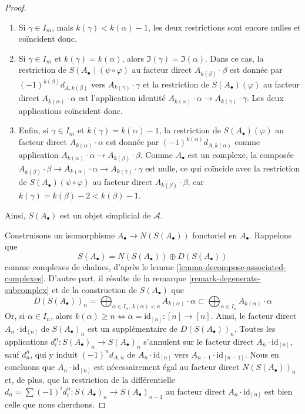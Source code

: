 \begin{proof}
\begin{enumerate}
\begin{enumerate}
$S(A_\bullet)(\psi \circ \varphi)$ au facteur direct $A_{k(\beta)} \cdot \beta$
et celle de $S(A_\bullet)(\varphi)$ au facteur direct
$A_{k(\alpha)} \cdot \alpha$ sont toutes deux nulles ; elles coïncident donc.
\item Si $\gamma \in I_m$, mais $k(\gamma) < k(\alpha) - 1$,
les deux restrictions sont encore nulles et coïncident donc.
\item Si $\gamma \in I_m$ et $k(\gamma) = k(\alpha)$, alors
$\Im(\gamma) = \Im(\alpha)$. Dans ce cas, la restriction de
$S(A_\bullet)(\psi \circ \varphi)$
au facteur direct $A_{k(\beta)} \cdot \beta$ est donnée par
$(-1)^{k(\beta)}d_{A, k(\beta)}$ vers $A_{k(\gamma)} \cdot \gamma$
et la restriction de $S(A_\bullet)(\varphi)$ au facteur direct
$A_{k(\alpha)} \cdot \alpha$ est l'application identité
$A_{k(\alpha)} \cdot \alpha \to A_{k(\gamma)} \cdot \gamma$.
Les deux applications coïncident donc.
\item Enfin, si $\gamma \in I_m$ et $k(\gamma) = k(\alpha) - 1$, la restriction de
$S(A_\bullet)(\varphi)$ au facteur direct
$A_{k(\alpha)} \cdot \alpha$ est donnée par $(-1)^{k(\alpha)} d_{A, k(\alpha)}$
comme application
$A_{k(\alpha)} \cdot \alpha \to A_{k(\beta)} \cdot \beta$.
Comme $A_\bullet$ est un complexe, la composée
$A_{k(\beta)} \cdot \beta \to
A_{k(\alpha)} \cdot \alpha \to A_{k(\gamma)} \cdot \gamma$
est nulle, ce qui coïncide avec la restriction de
$S(A_\bullet)(\psi \circ \varphi)$
au facteur direct $A_{k(\beta)} \cdot \beta$,
car $k(\gamma) = k(\beta) - 2 < k(\beta) - 1$.
\end{enumerate}
\end{enumerate}
Ainsi, $S(A_\bullet)$ est un objet simplicial de $\mathcal{A}$.

\medskip\noindent
Construisons un isomorphisme $A_\bullet \to N(S(A_\bullet))$
fonctoriel en $A_\bullet$. Rappelons que
$$
S(A_\bullet) =  N(S(A_\bullet)) \oplus D(S(A_\bullet))
$$
comme complexes de chaînes, d'après le lemme
\ref{lemma-decompose-associated-complexes}.
D'autre part, il résulte de la remarque \ref{remark-degenerate-subcomplex}
et de la construction de $S(A_\bullet)$ que
$$
D(S(A_\bullet))_n =
\bigoplus\nolimits_{\alpha \in I_n,\ k(\alpha) < n} A_{k(\alpha)} \cdot \alpha
\subset
\bigoplus\nolimits_{\alpha \in I_n} A_{k(\alpha)} \cdot \alpha
$$
Or, si $\alpha \in I_n$, alors
$k(\alpha) \geq n \Leftrightarrow \alpha = \text{id}_{[n]} : [n] \to [n]$.
Ainsi, le facteur direct $A_n \cdot \text{id}_{[n]}$ de $S(A_\bullet)_n$
est un supplémentaire de $D(S(A_\bullet))_n$.
Toutes les applications $d^n_i : S(A_\bullet)_n \to S(A_\bullet)_n$
s'annulent sur le facteur direct $A_n \cdot \text{id}_{[n]}$,
sauf $d^n_n$, qui y induit $(-1)^n d_{A, n}$ de
$A_n \cdot \text{id}_{[n]}$ vers $A_{n - 1} \cdot \text{id}_{[n - 1]}$.
Nous en concluons que $A_n \cdot \text{id}_{[n]}$ est nécessairement
égal au facteur direct $N(S(A_\bullet))_n$ et, de plus, que
la restriction de la différentielle
$d_n = \sum (-1)^id^n_i : S(A_\bullet)_n \to S(A_\bullet)_{n - 1}$
au facteur direct $A_n \cdot \text{id}_{[n]}$ est bien celle que nous cherchons.


\end{proof}
